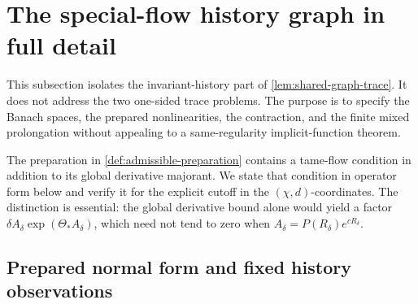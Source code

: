 \section{The special-flow history graph in full detail}
\label{subsec:invariant-history-details}

This subsection isolates the invariant-history part of
\cref{lem:shared-graph-trace}.  It does not address the two one-sided trace
problems.  The purpose is to specify the Banach spaces, the prepared
nonlinearities, the contraction, and the finite mixed prolongation without
appealing to a same-regularity implicit-function theorem.

The preparation in \cref{def:admissible-preparation} contains a tame-flow
condition in addition to its global derivative majorant.  We state that
condition in operator form below and verify it for the explicit cutoff in
the \((\chi,d)\)-coordinates.  The distinction is essential:
the global derivative bound alone would yield a factor
\(\delta A_\delta\exp(\Theta_*A_\delta)\), which need not tend to zero when
\(A_\delta=P(R_\delta)e^{cR_\delta}\).

\subsection{Prepared normal form and fixed history observations}

